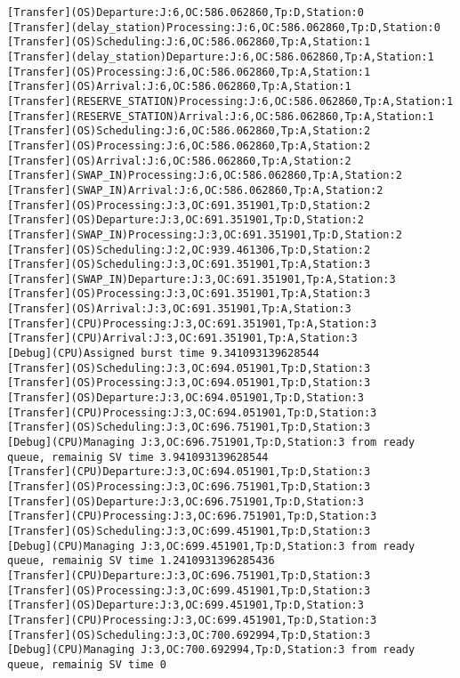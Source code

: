 \documentclass[12pt,a4paper]{article}
\begin{document}
\begin{lstlisting}
[Transfer](OS)Departure:J:6,OC:586.062860,Tp:D,Station:0
[Transfer](delay_station)Processing:J:6,OC:586.062860,Tp:D,Station:0
[Transfer](OS)Scheduling:J:6,OC:586.062860,Tp:A,Station:1
[Transfer](delay_station)Departure:J:6,OC:586.062860,Tp:A,Station:1
[Transfer](OS)Processing:J:6,OC:586.062860,Tp:A,Station:1
[Transfer](OS)Arrival:J:6,OC:586.062860,Tp:A,Station:1
[Transfer](RESERVE_STATION)Processing:J:6,OC:586.062860,Tp:A,Station:1
[Transfer](RESERVE_STATION)Arrival:J:6,OC:586.062860,Tp:A,Station:1
[Transfer](OS)Scheduling:J:6,OC:586.062860,Tp:A,Station:2
[Transfer](OS)Processing:J:6,OC:586.062860,Tp:A,Station:2
[Transfer](OS)Arrival:J:6,OC:586.062860,Tp:A,Station:2
[Transfer](SWAP_IN)Processing:J:6,OC:586.062860,Tp:A,Station:2
[Transfer](SWAP_IN)Arrival:J:6,OC:586.062860,Tp:A,Station:2
[Transfer](OS)Processing:J:3,OC:691.351901,Tp:D,Station:2
[Transfer](OS)Departure:J:3,OC:691.351901,Tp:D,Station:2
[Transfer](SWAP_IN)Processing:J:3,OC:691.351901,Tp:D,Station:2
[Transfer](OS)Scheduling:J:2,OC:939.461306,Tp:D,Station:2
[Transfer](OS)Scheduling:J:3,OC:691.351901,Tp:A,Station:3
[Transfer](SWAP_IN)Departure:J:3,OC:691.351901,Tp:A,Station:3
[Transfer](OS)Processing:J:3,OC:691.351901,Tp:A,Station:3
[Transfer](OS)Arrival:J:3,OC:691.351901,Tp:A,Station:3
[Transfer](CPU)Processing:J:3,OC:691.351901,Tp:A,Station:3
[Transfer](CPU)Arrival:J:3,OC:691.351901,Tp:A,Station:3
[Debug](CPU)Assigned burst time 9.341093139628544
[Transfer](OS)Scheduling:J:3,OC:694.051901,Tp:D,Station:3
[Transfer](OS)Processing:J:3,OC:694.051901,Tp:D,Station:3
[Transfer](OS)Departure:J:3,OC:694.051901,Tp:D,Station:3
[Transfer](CPU)Processing:J:3,OC:694.051901,Tp:D,Station:3
[Transfer](OS)Scheduling:J:3,OC:696.751901,Tp:D,Station:3
[Debug](CPU)Managing J:3,OC:696.751901,Tp:D,Station:3 from ready queue, remainig SV time 3.941093139628544
[Transfer](CPU)Departure:J:3,OC:694.051901,Tp:D,Station:3
[Transfer](OS)Processing:J:3,OC:696.751901,Tp:D,Station:3
[Transfer](OS)Departure:J:3,OC:696.751901,Tp:D,Station:3
[Transfer](CPU)Processing:J:3,OC:696.751901,Tp:D,Station:3
[Transfer](OS)Scheduling:J:3,OC:699.451901,Tp:D,Station:3
[Debug](CPU)Managing J:3,OC:699.451901,Tp:D,Station:3 from ready queue, remainig SV time 1.2410931396285436
[Transfer](CPU)Departure:J:3,OC:696.751901,Tp:D,Station:3
[Transfer](OS)Processing:J:3,OC:699.451901,Tp:D,Station:3
[Transfer](OS)Departure:J:3,OC:699.451901,Tp:D,Station:3
[Transfer](CPU)Processing:J:3,OC:699.451901,Tp:D,Station:3
[Transfer](OS)Scheduling:J:3,OC:700.692994,Tp:D,Station:3
[Debug](CPU)Managing J:3,OC:700.692994,Tp:D,Station:3 from ready queue, remainig SV time 0

\end{lstlisting}
\end{document}

